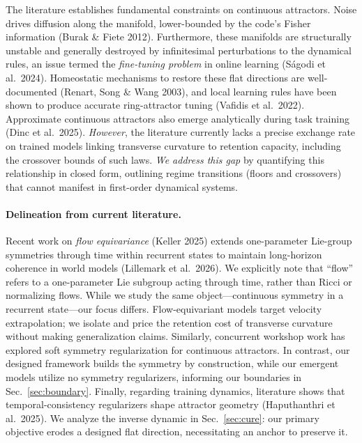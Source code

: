 \documentclass{article}
\begin{document}
The literature establishes fundamental constraints on continuous attractors. Noise drives diffusion along the manifold, lower-bounded by the code's Fisher information (Burak \& Fiete 2012). Furthermore, these manifolds are structurally unstable and generally destroyed by infinitesimal perturbations to the dynamical rules, an issue termed the \emph{fine-tuning problem} in online learning (S\'agodi et al.\ 2024). Homeostatic mechanisms to restore these flat directions are well-documented (Renart, Song \& Wang 2003), and local learning rules have been shown to produce accurate ring-attractor tuning (Vafidis et al.\ 2022). Approximate continuous attractors also emerge analytically during task training (Dinc et al.\ 2025). \emph{However}, the literature currently lacks a precise exchange rate on trained models linking transverse curvature to retention capacity, including the crossover bounds of such laws. \emph{We address this gap} by quantifying this relationship in closed form, outlining regime transitions (floors and crossovers) that cannot manifest in first-order dynamical systems.

\paragraph{Delineation from current literature.} Recent work on \emph{flow equivariance} (Keller 2025) extends one-parameter Lie-group symmetries through time within recurrent states to maintain long-horizon coherence in world models (Lillemark et al.\ 2026). We explicitly note that ``flow'' refers to a one-parameter Lie subgroup acting through time, rather than Ricci or normalizing flows. While we study the same object---continuous symmetry in a recurrent state---our focus differs. Flow-equivariant models target velocity extrapolation; we isolate and price the retention cost of transverse curvature without making generalization claims. Similarly, concurrent workshop work has explored soft symmetry regularization for continuous attractors. In contrast, our designed framework builds the symmetry by construction, while our emergent models utilize no symmetry regularizers, informing our boundaries in Sec.~\ref{sec:boundary}. Finally, regarding training dynamics, literature shows that temporal-consistency regularizers shape attractor geometry (Haputhanthri et al.\ 2025). We analyze the inverse dynamic in Sec.~\ref{sec:cure}: our primary objective erodes a designed flat direction, necessitating an anchor to preserve it.
\end{document}
